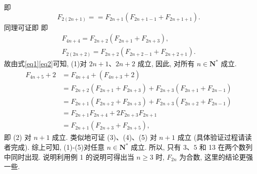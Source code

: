 即
$$
F_{2(2 n+1)}==F_{2 n+1}\left(F_{2 n+1-1}+F_{2 n+1+1}\right) . \label{eq1}
$$
同理可证即
即
$$
\begin{gathered}
F_{4 n+4}=F_{2 n+2}\left(F_{2 n+1}+F_{2 n+3}\right), \\
F_{2(2 n+2)}=F_{2 n+2}\left(F_{2 n+2-1}+F_{2 n+2+1}\right) . \label{eq2}
\end{gathered}
$$
故由式\ref{eq1}\ref{eq2}可知, (1)对 $2 n+1 、 2 n+2$ 成立, 因此, 对所有 $n \in \mathbf{N}^*$ 成立.
$$
\begin{aligned}
F_{4 n+5}+2 & =F_{4 n+4}+\left(F_{4 n+3}+2\right) \\
& =F_{2 n+2}\left(F_{2 n+1}+F_{2 n+3}\right)+F_{2 n+3}\left(F_{2 n+1}+F_{2 n-1}\right) \\
& =F_{2 n+1}\left(F_{2 n+2}+F_{2 n+3}\right)+F_{2 n+3}\left(F_{2 n+2}+F_{2 n-1}\right) \\
& =F_{2 n+1} F_{2 n+4}+2 F_{2 n+3} F_{2 n+1} \\
& =F_{2 n+1}\left(F_{2 n+3}+F_{2 n+5}\right),
\end{aligned}
$$
即 (2) 对 $n+1$ 成立.
类似地可证 (3)、(4)、(5) 对 $n+1$ 成立 (具体验证过程请读者完成).
综上可知, (1)-(5)对任意 $n \in \mathbf{N}^*$ 成立.
所以, 只有 $3 、 5$ 和 13 在两个数列中同时出现.
说明利用例 1 的说明可得出当 $n \geqslant 3$ 时, $F_{2 n}$ 为合数, 这里的结论更强一些.


